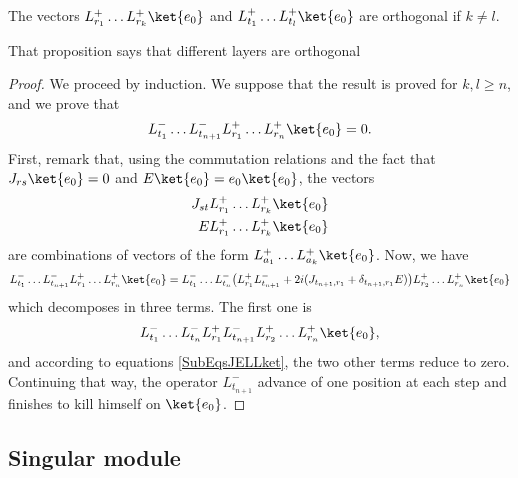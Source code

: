 \begin{proposition}
The vectors $L^+_{r_1}\ldots L^+_{r_k}\ket{e_0}$ and $L^+_{t_1}\ldots L^+_{t_l}\ket{e_0}$ are orthogonal if $k\neq l$.
\end{proposition}
That proposition says that different layers are orthogonal

\begin{proof}
We proceed by induction. We suppose that the result is proved for $k,l\geq n$, and we prove that 
\begin{equation}
	L^-_{t_1}\ldots L^-_{t_{n+1}}L^+_{r_1}\ldots L^+_{r_n}\ket{e_0}=0.
\end{equation}
First, remark that, using the commutation relations and the fact that $J_{rs}\ket{e_0}=0$ and $E\ket{e_0}=e_0\ket{e_0}$, the vectors
\begin{subequations}		\label{SubEqsJELLket}
	\begin{align}
		J_{st}L^+_{r_1}\ldots L^+_{r_k}\ket{e_0}\\
		EL^+_{r_1}\ldots L^+_{r_k}\ket{e_0}
	\end{align}
\end{subequations}
are combinations of vectors of the form $L^+_{a_1}\ldots L^+_{a_k}\ket{e_0}$. Now, we have
\begin{equation}
	L^-_{t_1}\ldots L^-_{t_{n+1}}L^+_{r_1}\ldots L^+_{r_n}\ket{e_0}= L^-_{t_1}\ldots L^-_{t_n}\big( L^+_{r_1}L^-_{t_{n+1}}+2i(J_{t_{n+1},r_1} + \delta_{t_{n+1},r_1}E ) \big)L^+_{r_2}\ldots L^+_{r_n}\ket{e_0}
\end{equation}
which decomposes in three terms. The first one is
\begin{equation}
	L^-_{t_1}\ldots L^-_{t_n}L^+_{r_1}L^-_{t_{n+1}}L^+_{r_2}\ldots L^+_{r_n}\ket{e_0},
\end{equation}
and according to equations \eqref{SubEqsJELLket}, the two other terms reduce to zero. Continuing that way, the operator $L^-_{t_{n+1}}$ advance of one position at each step and finishes to kill himself on $\ket{e_0}$.
\end{proof}

					\subsection{Singular module}

